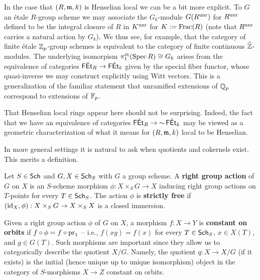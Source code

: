 \documentclass[11pt]{article}
\begin{document}
In the case that $(R,\mathfrak{m},k)$ is Henselian local we can be a bit more explicit. To $G$ an \'{e}tale $R$-group scheme we may associate the $G_k$-module $G(R^{\operatorname{unr}})$ for $R^{\operatorname{unr}}$ defined to be the integral closure of $R$ in $K^{\operatorname{unr}}$ for $K:=\operatorname{Frac}(R)$ (note that $R^{\operatorname{unr}}$ carries a natural action by $G_k$). We thus see, for example, that the category of finite \'{e}tale $\mathbb{Z}_p$-group schemes is equivalent to the category of finite continuous $\widehat{\mathbb{Z}}$-modules. The underlying isomorpism $\pi_1^{\operatorname{\acute{e}t}}(\operatorname{Spec} R)\cong G_k$ arises from the equivalence of categories $\operatorname{\mathsf{F\!\operatorname{\mathsf{\acute{E}t}}}}_R\to\operatorname{\mathsf{F\!\operatorname{\mathsf{\acute{E}t}}}}_k$ given by the special fiber functor, whose quasi-inverse we may construct explicitly using Witt vectors. This is a generalization of the familiar statement that unramified extensions of $\mathbb{Q}_p$ correspond to extensions of $\mathbb{F}_p$.

\begin{remark}
That Henselian local rings appear here should not be surprising. Indeed, the fact that we have an equivalence of categories $\operatorname{\mathsf{F\!\operatorname{\mathsf{\acute{E}t}}}}_R\to{\sim}\operatorname{\mathsf{F\!\operatorname{\mathsf{\acute{E}t}}}}_k$ may be viewed as a geometric characterization of what it means for $(R,\mathfrak{m},k)$ local to be Henselian.
\end{remark}

In more general settings it is natural to ask when quotients and cokernels exist. This merits a definition.

\begin{definition}
Let $S\in\operatorname{\mathsf{Sch}}$ and $G,X\in\operatorname{\mathsf{Sch}}_S$ with $G$ a group scheme. A \textbf{right group action} of $G$ on $X$ is an $S$-scheme morphism $\phi: X\times_SG\to X$ inducing right group actions on $T$-points for every $T\in\operatorname{\mathsf{Sch}}_S$. The action $\phi$ is \textbf{strictly free} if $(\operatorname{id}_X,\phi): X\times_SG\to X\times_SX$ is a closed immersion.

Given a right group action $\phi$ of $G$ on $X$, a morphism $f: X\to Y$ is \textbf{constant on orbits} if $f\circ\phi=f\circ\operatorname{pr}_1$ -- i.e., $f(xg)=f(x)$ for every $T\in\operatorname{\mathsf{Sch}}_S$, $x\in X(T)$, and $g\in G(T)$. Such morphisms are important since they allow us to categorically describe the quotient $X/G$. Namely, the quotient $q: X\to X/G$ (if it exists) is the initial (hence unique up to unique isomorphism) object in the category of $S$-morphisms $X\to Z$ constant on orbits.
\end{definition}
\end{document}
